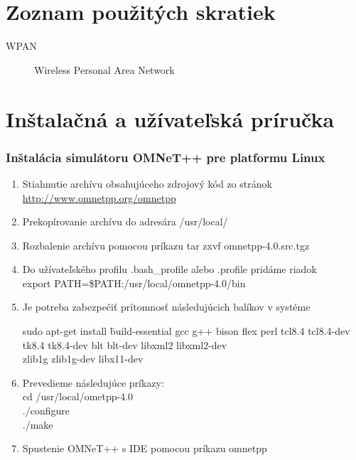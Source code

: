 \documentclass[11pt,twoside,a4paper]{book}
\begin{document}
\chapter{Zoznam použitých skratiek}

\begin{description}
\item[WPAN] Wireless Personal Area Network
\end{description}



\chapter{Inštalačná a užívateľská príručka}

\subsection{Inštalácia simulátoru OMNeT++ pre platformu Linux}
\begin{enumerate}
 \item Stiahnutie archívu obsahujúceho zdrojový kód zo stránok \\
 \url{http://www.omnetpp.org/omnetpp}
 \item Prekopírovanie archívu do adresára /usr/local/
 \item Rozbalenie archívu pomocou príkazu tar zxvf omnetpp-4.0.src.tgz
 \item Do užívateľského profilu .bash\_profile alebo .profile pridáme riadok \\
  export PATH=\$PATH:/usr/local/omnetpp-4.0/bin
  \item Je potreba zabezpečiť prítomnosť následujúcich balíkov v systéme 
    \begin{tabbing}
    sudo apt-get install \= build-essential gcc g++ bison flex perl tcl8.4 tcl8.4-dev \\
                       \> tk8.4 tk8.4-dev blt blt-dev libxml2 libxml2-dev \\
                       \> zlib1g zlib1g-dev libx11-dev
    \end{tabbing}    
 \item Prevedieme následujúce príkazy: \\
   cd /usr/local/ometpp-4.0 \\
   ./configure \\
   ./make
 \item Spustenie OMNeT++ s IDE pomocou príkazu omnetpp 
\end{enumerate}
\end{document}
